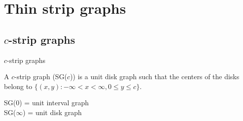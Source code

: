 \section{Thin strip graphs}

\subsection{$c$-strip graphs}

\begin{frame}{$c$-strip graphs}
\begin{definition}
  A $c$-strip graph (SG($c$)) is a unit disk graph such that the centers of the disks belong
  to $\{(x,y) : -\infty < x < \infty, 0 \leq y \leq c\}$.
\end{definition}
\pause

\begin{remark}
  SG($0$) = unit interval graph\\
  SG($\infty$) = unit disk graph
\end{remark}
\end{frame}

